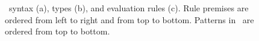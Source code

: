 \begin{figure}[t]
  \begin{minipage}{.385\columnwidth}
    
    \vspace*{1ex}

   
    \vspace*{1ex}

    
  \end{minipage}
  \begin{minipage}{.65\columnwidth}
    
  \end{minipage}
  \caption{\miniocaml\  syntax (a), types (b), and evaluation rules (c).
    Rule premises are ordered from left to right and from top to bottom.
    Patterns in \smatch\ are ordered from top to bottom.        
  }
  \label{fig-syn-and-sem}
\end{figure}
